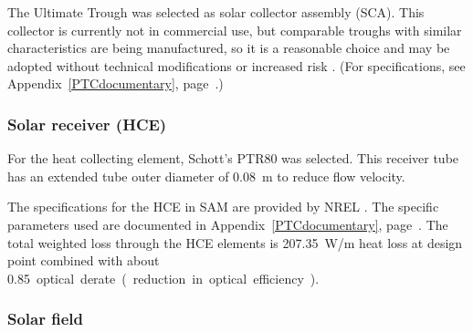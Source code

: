 The Ultimate Trough was selected as solar collector assembly (SCA). This collector is currently not in commercial use, but comparable troughs with similar characteristics are being manufactured, so it is a reasonable choice and may be adopted without technical modifications or increased risk \cite{Riffelmann2014}. (For specifications, see Appendix~\ref{PTCdocumentary}, page~\pageref{PTC_Ultimate_config}.)


\subsubsection{Solar receiver (HCE)}
For the heat collecting element, Schott's PTR80 was selected. This receiver tube has an extended tube outer diameter of \SI{0.08}{m} to reduce flow velocity.


The specifications for the \ac{HCE} in \ac{SAM} are provided by  \ac{NREL} \cite{Kutscher2012}. The specific parameters used are documented in Appendix~\ref{PTCdocumentary}, page~\pageref{PTC_HCE}. The total weighted loss through the HCE elements is \SI{207.35}{W/m} heat loss at design point combined with about \SI{0.85} optical derate (reduction in optical efficiency).


\subsubsection{Solar field}

